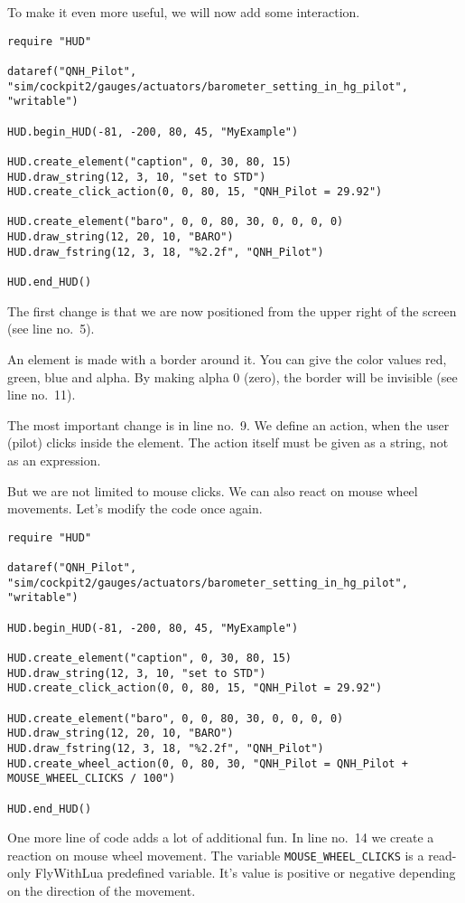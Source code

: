 \documentclass[11pt,parskip=half,a4paper]{scrartcl}
\begin{document}
To make it even more useful, we will now add some interaction.

\begin{lstlisting}[firstnumber=1]
require "HUD"

dataref("QNH_Pilot", "sim/cockpit2/gauges/actuators/barometer_setting_in_hg_pilot", "writable")

HUD.begin_HUD(-81, -200, 80, 45, "MyExample")

HUD.create_element("caption", 0, 30, 80, 15)
HUD.draw_string(12, 3, 10, "set to STD")
HUD.create_click_action(0, 0, 80, 15, "QNH_Pilot = 29.92")

HUD.create_element("baro", 0, 0, 80, 30, 0, 0, 0, 0)
HUD.draw_string(12, 20, 10, "BARO")
HUD.draw_fstring(12, 3, 18, "%2.2f", "QNH_Pilot")

HUD.end_HUD()
\end{lstlisting}

The first change is that we are now positioned from the upper right of the screen (see line no.~5).

An element is made with a border around it. You can give the color values red, green, blue and alpha. By making alpha 0 (zero), the border will be invisible (see line no.~11).

The most important change is in line no.~9. We define an action, when the user (pilot) clicks inside the element. The action itself must be given as a string, not as an expression.

But we are not limited to mouse clicks. We can also react on mouse wheel movements. Let's modify the code once again.

\begin{lstlisting}[firstnumber=1]
require "HUD"

dataref("QNH_Pilot", "sim/cockpit2/gauges/actuators/barometer_setting_in_hg_pilot", "writable")

HUD.begin_HUD(-81, -200, 80, 45, "MyExample")

HUD.create_element("caption", 0, 30, 80, 15)
HUD.draw_string(12, 3, 10, "set to STD")
HUD.create_click_action(0, 0, 80, 15, "QNH_Pilot = 29.92")

HUD.create_element("baro", 0, 0, 80, 30, 0, 0, 0, 0)
HUD.draw_string(12, 20, 10, "BARO")
HUD.draw_fstring(12, 3, 18, "%2.2f", "QNH_Pilot")
HUD.create_wheel_action(0, 0, 80, 30, "QNH_Pilot = QNH_Pilot + MOUSE_WHEEL_CLICKS / 100")

HUD.end_HUD()
\end{lstlisting}

One more line of code adds a lot of additional fun. In line no.~14 we create a reaction on mouse wheel movement. The variable \verb|MOUSE_WHEEL_CLICKS| is a read-only FlyWithLua predefined variable. It's value is positive or negative depending on the direction of the movement.
\end{document}

